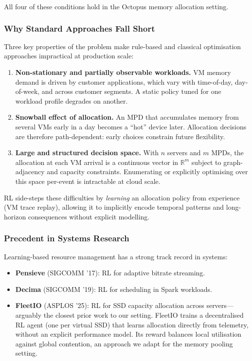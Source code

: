 \documentclass[11pt]{article}
\begin{document}
All four of these conditions hold in the Octopus memory allocation setting.

\subsubsection*{Why Standard Approaches Fall Short}

Three key properties of the problem make rule-based and classical
optimisation approaches impractical at production scale:

\begin{enumerate}
    \item \textbf{Non-stationary and partially observable workloads.}
    VM memory demand is driven by customer applications, which vary with
    time-of-day, day-of-week, and across customer segments.  A static policy
    tuned for one workload profile degrades on another.

    \item \textbf{Snowball effect of allocation.}
    An MPD that accumulates memory from several VMs early in a day becomes a
    ``hot'' device later.  Allocation decisions are therefore path-dependent:
    early choices constrain future flexibility.

    \item \textbf{Large and structured decision space.}
    With $n$ servers and $m$ MPDs, the allocation at each VM arrival is a
    continuous vector in $\mathbb{R}^m$ subject to graph-adjacency and
    capacity constraints.  Enumerating or explicitly optimising over this
    space per-event is intractable at cloud scale.
\end{enumerate}

RL side-steps these difficulties by \emph{learning} an allocation policy from
experience (VM trace replay), allowing it to implicitly encode temporal
patterns and long-horizon consequences without explicit modelling.

\subsubsection*{Precedent in Systems Research}

Learning-based resource management has a strong track record in systems:
\begin{itemize}
    \item \textbf{Pensieve} (SIGCOMM '17): RL for adaptive bitrate streaming.
    \item \textbf{Decima} (SIGCOMM '19): RL for scheduling in Spark workloads.
    \item \textbf{FleetIO} (ASPLOS '25): RL for SSD capacity allocation across
          servers---arguably the closest prior work to our setting.  FleetIO
          trains a decentralised RL agent (one per virtual SSD) that
          learns allocation directly from telemetry, without an explicit
          performance model.  Its reward balances local utilisation against
          global contention, an approach we adapt for the memory pooling
          setting.
\end{itemize}
\end{document}
